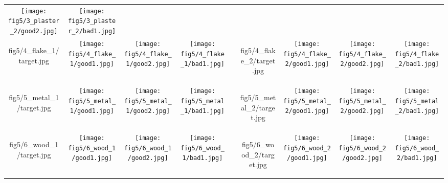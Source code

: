 \begin{figure*}[t]
\begin{tabular}{ccccccccc}
		\texttt{[image: fig5/3\_plaster\_2/good2.jpg]} &
		\texttt{[image: fig5/3\_plaster\_2/bad1.jpg]}
		\\
		\begin{overpic}[width=\resultwidth]{fig5/4_flake_1/target.jpg}
			\imglabel{Metallicflake-1}
		\end{overpic} &
		\texttt{[image: fig5/4\_flake\_1/good1.jpg]} &
		\texttt{[image: fig5/4\_flake\_1/good2.jpg]} &
		\texttt{[image: fig5/4\_flake\_1/bad1.jpg]} &
		&
		\begin{overpic}[width=\resultwidth]{fig5/4_flake_2/target.jpg}
			\imglabel{Metallicflake-2}
		\end{overpic} &
		\texttt{[image: fig5/4\_flake\_2/good1.jpg]} &
		\texttt{[image: fig5/4\_flake\_2/good2.jpg]} &
		\texttt{[image: fig5/4\_flake\_2/bad1.jpg]}
		\\
		\begin{overpic}[width=\resultwidth]{fig5/5_metal_1/target.jpg}
			\imglabel{Brushmetal-1}
		\end{overpic} &
		\texttt{[image: fig5/5\_metal\_1/good1.jpg]} &
		\texttt{[image: fig5/5\_metal\_1/good2.jpg]} &
		\texttt{[image: fig5/5\_metal\_1/bad1.jpg]} &
		&
		\begin{overpic}[width=\resultwidth]{fig5/5_metal_2/target.jpg}
			\imglabel{Brushmetal-2}
		\end{overpic} &
		\texttt{[image: fig5/5\_metal\_2/good1.jpg]} &
		\texttt{[image: fig5/5\_metal\_2/good2.jpg]} &
		\texttt{[image: fig5/5\_metal\_2/bad1.jpg]}
		\\
		\begin{overpic}[width=\resultwidth]{fig5/6_wood_1/target.jpg}
			\imglabel{Wood-1}
		\end{overpic} &
		\texttt{[image: fig5/6\_wood\_1/good1.jpg]} &
		\texttt{[image: fig5/6\_wood\_1/good2.jpg]} &
		\texttt{[image: fig5/6\_wood\_1/bad1.jpg]} & &
		\begin{overpic}[width=\resultwidth]{fig5/6_wood_2/target.jpg}
			\imglabel{Wood-2}
		\end{overpic} &
		\texttt{[image: fig5/6\_wood\_2/good1.jpg]} &
		\texttt{[image: fig5/6\_wood\_2/good2.jpg]} &
		\texttt{[image: fig5/6\_wood\_2/bad1.jpg]}
	\end{tabular}
	\captionsetup{labelfont=bf,textfont=it}
	\caption{\label{fig:fig5}
		\textbf{Results} of our MCMC sampling on \textbf{fig5etic} inputs. Each row corresponds to two examples of a different material model. For each example, the first column is the fig5etic target image. We show MCMC samples in the other columns, where sample-1 and sample-2 are chosen closer to the peak of the posterior distribution, and sample-3 is further away. More results please refer to supplemental materials.
	}
\end{figure*}

